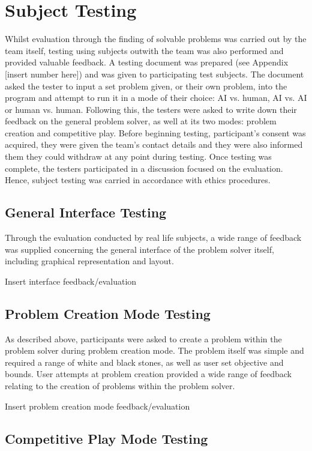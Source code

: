 \documentclass{l3proj}
\begin{document}
\section{Subject Testing}

Whilst evaluation through the finding of solvable problems was carried out by the team itself, testing using subjects outwith the team was also performed and provided valuable feedback. A testing document was prepared (see Appendix [insert number here]) and was given to participating test subjects. The document asked the tester to input a set problem given, or their own problem, into the program and attempt to run it in a mode of their choice: AI vs. human, AI vs. AI or human vs. human. Following this, the testers were asked to write down their feedback on the general problem solver, as well at its two modes: problem creation and competitive play. Before beginning testing, participant's consent was acquired, they were given the team's contact details and they were also informed them they could withdraw at any point during testing. Once testing was complete, the testers participated in a discussion focused on the evaluation. Hence, subject testing was carried in accordance with ethics procedures.

\subsection{General Interface Testing}

Through the evaluation conducted by real life subjects, a wide range of feedback was supplied concerning the general interface of the problem solver itself, including graphical representation and layout.

Insert interface feedback/evaluation

\subsection{Problem Creation Mode Testing}

As described above, participants were asked to create a problem within the problem solver during problem creation mode. The problem itself was simple and required a range of white and black stones, as well as user set objective and bounds. User attempts at problem creation provided a wide range of feedback relating to the creation of problems within the problem solver.

Insert problem creation mode feedback/evaluation

\subsection{Competitive Play Mode Testing}
\end{document}
